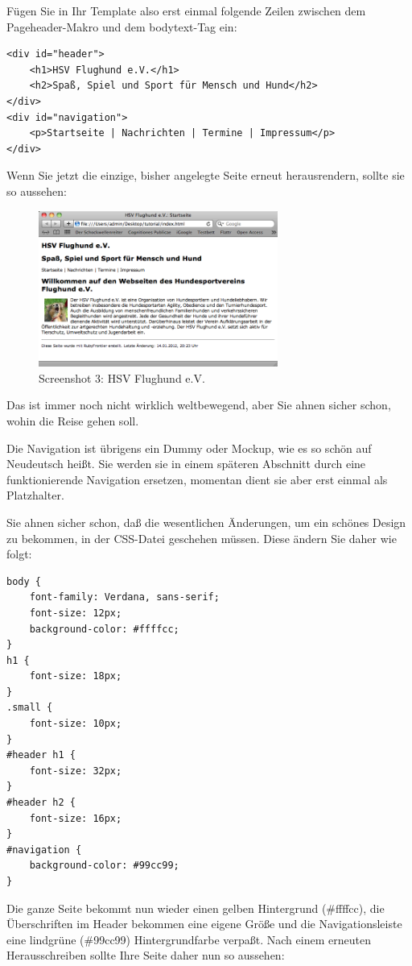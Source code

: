 \documentclass[11pt]{report}
\begin{document}
Fügen Sie in Ihr Template also erst einmal folgende Zeilen zwischen
dem Pageheader-Makro und dem bodytext-Tag ein:


\begin{verbatim}
<div id="header">
    <h1>HSV Flughund e.V.</h1>
    <h2>Spaß, Spiel und Sport für Mensch und Hund</h2>
</div>
<div id="navigation">
    <p>Startseite | Nachrichten | Termine | Impressum</p>
</div>
\end{verbatim}

Wenn Sie jetzt die einzige, bisher angelegte Seite erneut
herausrendern, sollte sie so aussehen:

\begin{figure}[h!]
\centering
\includegraphics[width=0.7\textwidth]{./images/flughund03.png}
\caption{\label{flughund03}Screenshot 3: HSV Flughund e.V.}
\end{figure}

Das ist immer noch nicht wirklich weltbewegend, aber Sie ahnen sicher
schon, wohin die Reise gehen soll.


Die Navigation ist übrigens ein Dummy oder Mockup, wie es so schön auf
Neudeutsch heißt. Sie werden sie in einem späteren Abschnitt durch
eine funktionierende Navigation ersetzen, momentan dient sie aber erst
einmal als Platzhalter.


Sie ahnen sicher schon, daß die wesentlichen Änderungen, um ein
schönes Design zu bekommen, in der CSS-Datei geschehen müssen. Diese
ändern Sie daher wie folgt:


\begin{verbatim}
body {
    font-family: Verdana, sans-serif;
    font-size: 12px;
    background-color: #ffffcc;
}
h1 {
    font-size: 18px;
}
.small {
    font-size: 10px;
}
#header h1 {
    font-size: 32px;
}
#header h2 {
    font-size: 16px;
}
#navigation {
    background-color: #99cc99;
}
\end{verbatim}

Die ganze Seite bekommt nun wieder einen gelben Hintergrund (\#ffffcc),
die Überschriften im Header bekommen eine eigene Größe und die
Navigationsleiste eine lindgrüne (\#99cc99) Hintergrundfarbe
verpaßt. Nach einem erneuten Herausschreiben sollte Ihre Seite daher
nun so aussehen:
\end{document}
